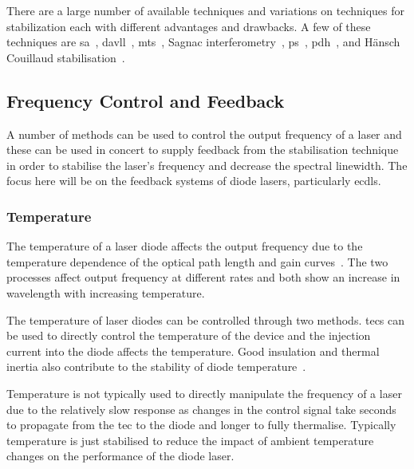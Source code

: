There are a large number of available techniques and variations on techniques for stabilization each with different advantages and drawbacks.
A few of these techniques are \gls{sa}~\cite{haroche_theory_1972, maguire_theoretical_2006, cuneo_optically_1994, preston_doppler-free_1996, saliba_linewidths_2009}, \gls{davll}~\cite{corwin_frequency-stabilized_1998, millett-sikking_davll_2007}, \gls{mts}~\cite{shirley_modulation_1982, mccarron_modulation_2008, xiang-hui_ultra-stable_2009,negnevitsky_wideband_2013}, Sagnac interferometry~\cite{robins_Interferometric_2002, jundt_non-linear_2003}, \acrfull{ps}~\cite{wieman_doppler-free_1976, lancaster_polarisation_1999, yoshikawa_frequency_2003, harris_polarization_2006, pearman_polarization_2002, tiwari_laser_2006, do_polarization_2008, torii_laser-phase_2012}, \gls{pdh}~\cite{drever_laser_1983}, and H\"ansch Couillaud stabilisation~\cite{hansch_laser_1980}.

\subsection{Frequency Control and Feedback}

A number of methods can be used to control the output frequency of a laser and these can be used in concert to supply feedback from the stabilisation technique in order to stabilise the laser's frequency and decrease the spectral linewidth.
The focus here will be on the feedback systems of diode lasers, particularly \glspl{ecdl}.

\subsubsection{Temperature}
The temperature of a laser diode affects the output frequency due to the temperature dependence of the optical path length and gain curves~\cite{wieman_using_1991}.
The two processes affect output frequency at different rates and both show an increase in wavelength with increasing temperature.

The temperature of laser diodes can be controlled through two methods. \Glspl{tec} can be used to directly control the temperature of the device and the injection current into the diode affects the temperature. Good insulation and thermal inertia also contribute to the stability of diode temperature~\cite{saliba_cold_2011}.

Temperature is not typically used to directly manipulate the frequency of a laser due to the relatively slow response as changes in the control signal take seconds to propagate from the \gls{tec} to the diode and longer to fully thermalise.
Typically temperature is just stabilised to reduce the impact of ambient temperature changes on the performance of the diode laser.

